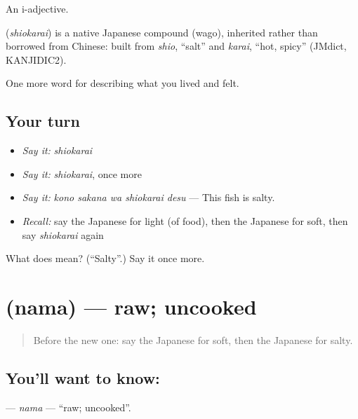An i-adjective.

\begin{cousinweb}
\textbf{} (\emph{shiokarai}) is a native Japanese compound (wago), inherited rather than borrowed from Chinese: built from \emph{shio}, \textquotedblleft{}salt\textquotedblright{} and \emph{karai}, \textquotedblleft{}hot, spicy\textquotedblright{} (JMdict, KANJIDIC2).
\end{cousinweb}

\begin{grammarlens}[title={What you've built}]
One more word for describing what you lived and felt.
\end{grammarlens}

\subsection*{Your turn}
\begin{itemize}
\raggedright
  \item \emph{Say it:} \emph{shiokarai}
  \item \emph{Say it:} \emph{shiokarai}, once more
  \item \emph{Say it:} \emph{kono sakana wa shiokarai desu} — This fish is salty.
  \item \emph{Recall:} say the Japanese for light (of food), then the Japanese for soft, then say \emph{shiokarai} again
\end{itemize}

\begin{tcolorbox}[breakable,colback=teal!4,colframe=teal!35!black,title={Before you move on}]
What does  mean? (\textquotedblleft{}Salty\textquotedblright{}.) Say it once more.
\end{tcolorbox}
\section[\texorpdfstring{\ja{なま} (nama)}{なま (nama)}]{ (nama) — raw; uncooked}

\label{lesson:JA-C496-nama}



\begin{quote}
Before the new one: say the Japanese for soft, then the Japanese for salty.
\end{quote}

\subsection*{You'll want to know: }
\textbf{} — \emph{nama} — \textquotedblleft{}raw; uncooked\textquotedblright{}.

